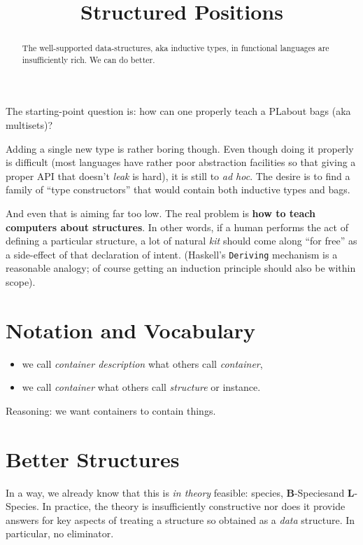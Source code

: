 \documentclass{article} %
\title{Structured Positions}
\author{}
\theoremstyle{plain}
\theoremstyle{definition}
\newcommand{\PL}{PL} %
\newcommand{\BSp}{\(\mathbf{B}\)-Species}
\newcommand{\LSp}{\(\mathbf{L}\)-Species}
\begin{document}
\maketitle
\begin{abstract}
The well-supported data-structures, aka inductive types, in functional
languages are insufficiently rich. We can do better.
\end{abstract}

The starting-point question is: how can one properly teach a \PL about
bags (aka multisets)?

Adding a single new type is rather boring though. Even though doing it
properly is difficult (most languages have rather poor abstraction facilities
so that giving a proper API that doesn't \emph{leak} is hard), it is still
to \textit{ad hoc}. The desire is to find a family of ``type constructors''
that would contain both inductive types and bags.

And even that is aiming far too low. The real problem is 
\textbf{how to teach computers about structures}. In other words, if a
human performs the act of defining a particular structure, a lot of
natural \emph{kit} should come along ``for free'' as a side-effect of
that declaration of intent. (Haskell's \texttt{Deriving} mechanism is
a reasonable analogy; of course getting an induction principle should also
be within scope).

\section{Notation and Vocabulary}

\begin{itemize}
\item we call \emph{container description} what others call \emph{container},
\item we call \emph{container} what others call \emph{structure} or
instance.
\end{itemize}
\noindent Reasoning: we want containers to contain things.

\section{Better Structures}

In a way, we already know that this is \textit{in theory} feasible:
species, \BSp and \LSp. In practice, the theory is insufficiently
constructive nor does it provide answers for key aspects of treating
a structure so obtained as a \emph{data} structure. In particular, no
eliminator.
\end{document}
